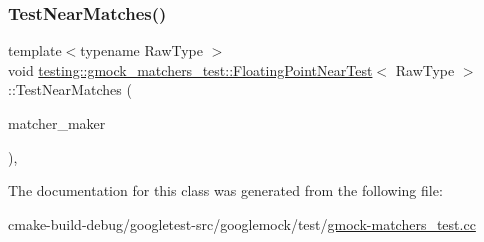 \subsubsection{\texorpdfstring{TestNearMatches()}{TestNearMatches()}}
{\footnotesize\ttfamily template$<$typename Raw\+Type $>$ \\
void \mbox{\hyperlink{classtesting_1_1gmock__matchers__test_1_1FloatingPointNearTest}{testing\+::gmock\+\_\+matchers\+\_\+test\+::\+Floating\+Point\+Near\+Test}}$<$ Raw\+Type $>$\+::Test\+Near\+Matches (\begin{DoxyParamCaption}\item[{testing\+::internal\+::\+Floating\+Eq\+Matcher$<$ Raw\+Type $>$($\ast$)(Raw\+Type, Raw\+Type)}]{matcher\+\_\+maker }\end{DoxyParamCaption})\hspace{0.3cm}{\ttfamily [inline]}, {\ttfamily [protected]}}



The documentation for this class was generated from the following file\+:\begin{DoxyCompactItemize}
\item 
cmake-\/build-\/debug/googletest-\/src/googlemock/test/\mbox{\hyperlink{gmock-matchers__test_8cc}{gmock-\/matchers\+\_\+test.\+cc}}\end{DoxyCompactItemize}
